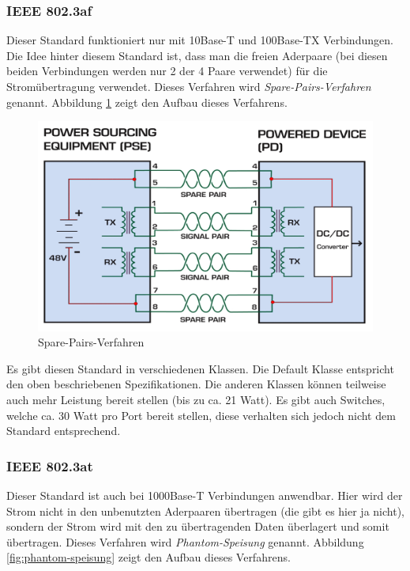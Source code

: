 \subsubsection{IEEE 802.3af}
Dieser Standard funktioniert nur mit 10Base-T und 100Base-TX Verbindungen. Die Idee hinter diesem Standard ist, dass man die freien Aderpaare (bei diesen beiden Verbindungen werden nur 2 der 4 Paare verwendet) für die Stromübertragung verwendet. Dieses Verfahren wird \emph{Spare-Pairs-Verfahren} genannt. Abbildung \ref{fig:spare-pairs} zeigt den Aufbau dieses Verfahrens.

\begin{figure}[h]
    \centering
    \leavevmode
    \includegraphics[width=1.0\linewidth]{figures/spare-pairs-verfahren-marked}
    \caption{Spare-Pairs-Verfahren\cite{poe1}}
    \label{fig:spare-pairs}
\end{figure}

Es gibt diesen Standard in verschiedenen Klassen. Die Default Klasse entspricht den oben beschriebenen Spezifikationen. Die anderen Klassen können teilweise auch mehr Leistung bereit stellen (bis zu ca. 21 Watt). Es gibt auch Switches, welche ca. 30 Watt pro Port bereit stellen, diese verhalten sich jedoch nicht dem Standard entsprechend.

\subsubsection{IEEE 802.3at}
Dieser Standard ist auch bei 1000Base-T Verbindungen anwendbar. Hier wird der Strom nicht in den unbenutzten Aderpaaren übertragen (die gibt es hier ja nicht), sondern der Strom wird mit den zu übertragenden Daten überlagert und somit übertragen. Dieses Verfahren wird \emph{Phantom-Speisung} genannt. Abbildung \ref{fig:phantom-speisung} zeigt den Aufbau dieses Verfahrens.

